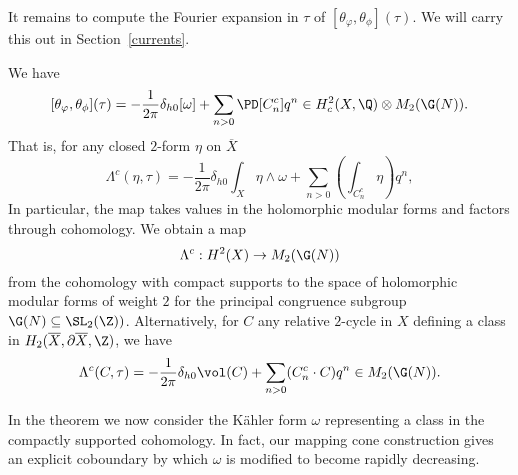 It remains to compute the Fourier expansion in $\tau$ of $[\theta_{\varphi}, \theta_{\phi}](\tau)$. We will carry this out in Section~\ref{currents}.

\begin{theorem}\label{FM-main-th}
We have
\[
[\theta_{\varphi}, \theta_{\phi}](\tau) =  -\frac{1}{2\pi}\delta_{h0} [\omega] + \sum_{n>0} \PD[C^c_n] q^n \in H_c^2(X,\Q) \otimes M_2(\G(N)).
\]
That is, for any closed $2$-form $\eta$ on $\overline{X}$
\[
\Lambda^c(\eta,\tau) = -\frac{1}{2\pi}\delta_{h0} \int_X \eta \wedge \omega + \sum_{n>0} \left( \int_{C^c_n} \eta \right)q^n,
\]
In particular, the map takes values in the holomorphic modular forms and factors through cohomology. We obtain a map
\begin{equation}
\Lambda^c: H^{2}(X) \to M_{2}(\G(N))
\end{equation}
from the cohomology with compact supports to the space of holomorphic modular forms of weight $2$ for the principal congruence subgroup $\G(N) \subseteq \SL_2(\Z))$.
Alternatively, for $C$ any relative $2$-cycle in $X$ defining a class in $H_2(\overline{X},\partial \overline{X},\Z)$, we have
\[
\Lambda^c(C,\tau) = -\frac{1}{2\pi}\delta_{h0} \vol(C) + \sum_{n>0} ( C^c_n \cdot C ) q^n \in M_2(\G(N)).
\]
\end{theorem}

\begin{remark}
In the theorem we now consider the K\"ahler form $\omega$ representing a class in the compactly supported cohomology. In fact, our mapping cone construction gives an explicit coboundary by which $\omega$ is modified to become rapidly decreasing.
\end{remark}
